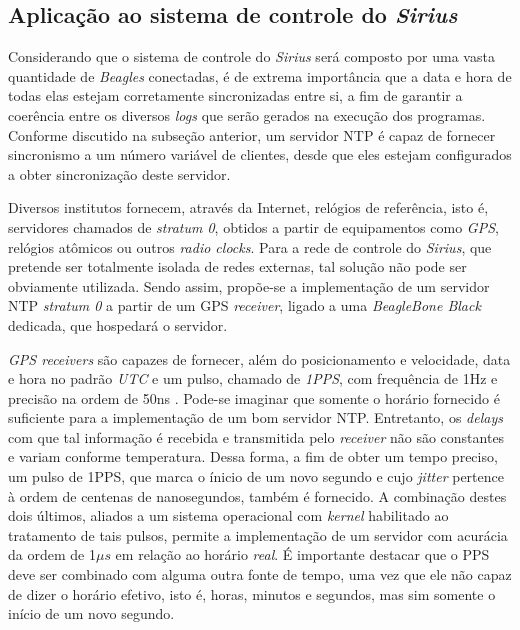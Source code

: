 \FloatBarrier
\subsection {Aplicação ao sistema de controle do \textit{Sirius}}

Considerando que o sistema de controle do \textit{Sirius} será composto por uma
vasta quantidade de \textit{Beagles} conectadas, é de extrema importância que a
data e hora de todas elas estejam corretamente sincronizadas entre si, a fim de
garantir a coerência entre os diversos \textit{logs} que serão gerados na
execução dos programas. Conforme discutido na subseção anterior, um servidor NTP
é capaz de fornecer sincronismo a um número variável de clientes, desde que eles
estejam configurados a obter sincronização deste servidor.

\vspace{12pt}  

Diversos institutos fornecem, através da Internet, relógios de referência, isto
é, servidores chamados de \textit{stratum 0}, obtidos a partir de equipamentos
como \textit{GPS}, relógios atômicos ou outros \textit{radio clocks}. Para a rede
de controle do \textit{Sirius}, que pretende ser totalmente isolada de redes
externas, tal solução não pode ser obviamente utilizada. Sendo assim, propõe-se
a implementação de um servidor NTP \textit{stratum 0} a partir de um GPS
\textit{receiver}, ligado a uma \textit{BeagleBone Black} dedicada, que
hospedará o servidor.

\vspace{12pt}

\textit{GPS receivers} são capazes de fornecer, além do posicionamento e
velocidade, data e hora no padrão \textit{UTC} e um pulso, chamado de
\textit{1PPS}, com frequência de 1Hz e precisão na ordem de 50ns
\cite{gpsdhowto}. Pode-se imaginar que somente o horário fornecido é suficiente
para a implementação de um bom servidor NTP. Entretanto, os \textit{delays} com
que tal informação é recebida e transmitida pelo \textit{receiver} não são
constantes e variam conforme temperatura. Dessa forma, a fim de obter um tempo
preciso, um pulso de 1PPS, que marca o ínicio de um novo segundo e cujo
\textit{jitter} pertence à ordem de centenas de nanosegundos, também é
fornecido. A combinação destes dois últimos, aliados a um sistema operacional com
\textit{kernel} habilitado ao tratamento de tais pulsos, permite a implementação
de um servidor com acurácia da ordem de 1\(\mu s\) em relação ao horário
\textit{real}. É importante destacar que o PPS deve ser combinado com alguma
outra fonte de tempo, uma vez que ele não capaz de dizer o horário efetivo, isto
é, horas, minutos e segundos, mas sim somente o início de um novo segundo.

